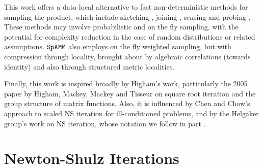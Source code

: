 \documentclass[letterpaper,twocolumn,amsmath,amsfont,amssymb,english,aps,jcp,preprintnumbers,groupaddress,nofootinbib,tightenlines,floatfix]{revtex4}
\newcommand{\mat}[1]{\boldsymbol{#1}}
\newcommand{\ot}{  {\scriptstyle \otimes}_{ \tau } }
\theoremstyle{plain}
\theoremstyle{remark}
\theoremstyle{plain}
\begin{document}
This work offers a data local alternative to fast non-deterministic methods for sampling the product, 
which include sketching \cite{Sarlos2006,Drineas2006,Mahoney2012,Pagh2013,Woodruff2015},
joining \cite{Mishra92,Hoel94,Jacox03,Chen07,Amossen09,Lieberman08,Kim09}, 
sensing \cite{iwen2009note} and probing \cite{chiu2012matrix}.  These  methods may involve probabilistic 
and on the fly sampling, with the potential for complexity reduction in the case of random distributions or related assumptions. 
$\tt SpAMM$  also employs on the fly weighted sampling,  but with 
compression through locality, brought about by algebraic correlations (towards identity) and also through structured metric localities.



Finally, this work is inspired broadly by Higham's work, particularly the 2005 paper by 
Higham, Mackey, Mackey and Tisseur \cite{higham2005} on square root iteration and the group structure of matrix functions.
Also, it is influenced by Chen and Chow's \cite{chen2014} approach to scaled NS iteration for ill-conditioned problems, and by 
the Helgaker group's work on NS iteration, whose notation we follow in part \cite{Jansik2007}.  



\section{Newton-Shulz Iterations}
\end{document}
